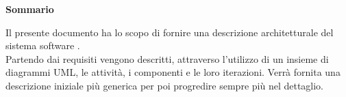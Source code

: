\Large{\textbf{Sommario}}\\
{
\normalsize
	\begin{center} {
		Il presente documento ha lo scopo di fornire una descrizione architetturale del sistema software \textbf{\mytalk}.\\
		Partendo dai requisiti vengono descritti, attraverso l'utilizzo di un insieme di diagrammi UML, le attività, i componenti e le loro iterazioni. Verrà fornita una descrizione iniziale più generica per poi progredire sempre più nel dettaglio.
	}
	\end{center}
}

